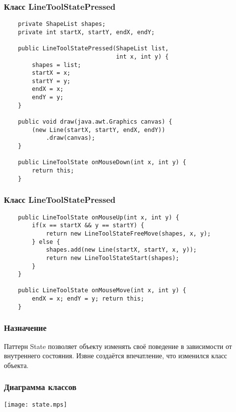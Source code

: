 \documentclass[handout]{beamer}
\begin{document}
\begin{frame}[fragile]
\frametitle{Класс LineToolStatePressed}
\begin{lstlisting}
    private ShapeList shapes;
    private int startX, startY, endX, endY;
    
    public LineToolStatePressed(ShapeList list,
                                int x, int y) {
        shapes = list;
        startX = x;
        startY = y;
        endX = x;
        endY = y;
    }
    
    public void draw(java.awt.Graphics canvas) {
        (new Line(startX, startY, endX, endY))
            .draw(canvas);
    }
    
    public LineToolState onMouseDown(int x, int y) {
        return this;
    }
\end{lstlisting}
\end{frame}
    
\begin{frame}[fragile]
\frametitle{Класс LineToolStatePressed}
\begin{lstlisting}      
    public LineToolState onMouseUp(int x, int y) {
        if(x == startX && y == startY) {
            return new LineToolStateFreeMove(shapes, x, y);
        } else {
            shapes.add(new Line(startX, startY, x, y));
            return new LineToolStateStart(shapes);
        }
    }
    
    public LineToolState onMouseMove(int x, int y) {
        endX = x; endY = y; return this;
    }
\end{lstlisting}
\end{frame}



\begin{frame}[fragile]
\frametitle{Назначение}
Паттерн State позволяет объекту изменять своё поведение в зависимости
от внутреннего состояния. Извне создаётся впечатление, что изменился
класс объекта.
\end{frame}


\begin{frame}[fragile]
\frametitle{Диаграмма классов}
\begin{center}
\texttt{[image: state.mps]}
\end{center}
\end{frame}
\end{document}

